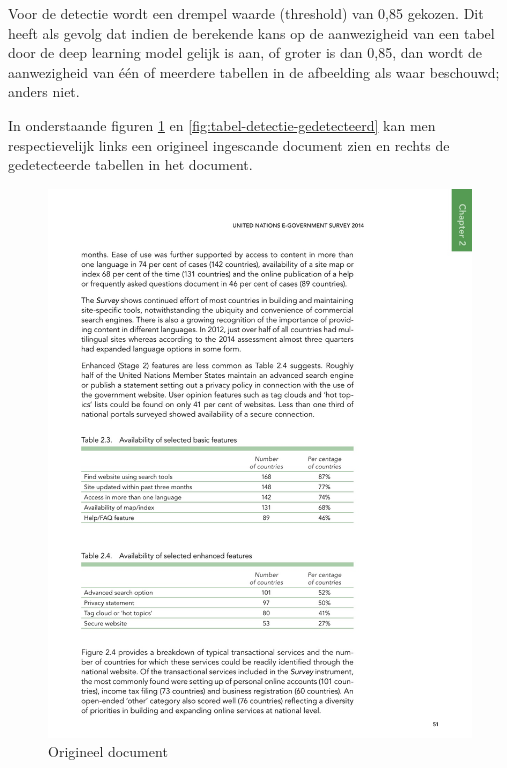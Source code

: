 Voor de detectie wordt een drempel waarde (threshold) van 0,85 gekozen. Dit heeft als gevolg dat indien de berekende kans op de aanwezigheid van een tabel door de deep learning model gelijk is aan, of groter is dan 0,85, dan wordt de aanwezigheid van één of meerdere tabellen in de afbeelding als waar beschouwd; anders niet.

In onderstaande figuren \ref{fig:tabel-detectie-origineel} en \ref{fig:tabel-detectie-gedetecteerd} kan men respectievelijk links een origineel ingescande document zien en rechts de gedetecteerde tabellen in het document.

\begin{figure}[H]
    \centering
    \begin{minipage}{0.5\textwidth}
        \centering
        \includegraphics[width=1\textwidth]{img/tabel_detectie_voorbeeld_origineel.jpg}
        \caption{Origineel document}
        \label{fig:tabel-detectie-origineel}
    \end{minipage}\hfill
    \begin{minipage}{0.5\textwidth}

\end{minipage}
\end{figure}
